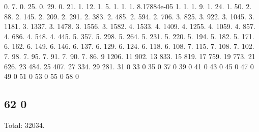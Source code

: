 0. 7. 0. 25. 0. 29. 0. 21. 1. 12. 1. 5. 1. 1. 1. 8.\+17884e-\/05 1. 1. 1. 9. 1. 24. 1. 50. 2. 88. 2. 145. 2. 209. 2. 291. 2. 383. 2. 485. 2. 594. 2. 706. 3. 825. 3. 922. 3. 1045. 3. 1181. 3. 1337. 3. 1478. 3. 1556. 3. 1582. 4. 1533. 4. 1409. 4. 1255. 4. 1059. 4. 857. 4. 686. 4. 548. 4. 445. 5. 357. 5. 298. 5. 264. 5. 231. 5. 220. 5. 194. 5. 182. 5. 171. 6. 162. 6. 149. 6. 146. 6. 137. 6. 129. 6. 124. 6. 118. 6. 108. 7. 115. 7. 108. 7. 102. 7. 98. 7. 95. 7. 91. 7. 90. 7. 86. 9 1206. 11 902. 13 833. 15 819. 17 759. 19 773. 21 626. 23 484. 25 407. 27 334. 29 281. 31 0 33 0 35 0 37 0 39 0 41 0 43 0 45 0 47 0 49 0 51 0 53 0 55 0 58 0 \subsection*{62 0 }

Total\+: 32034. 